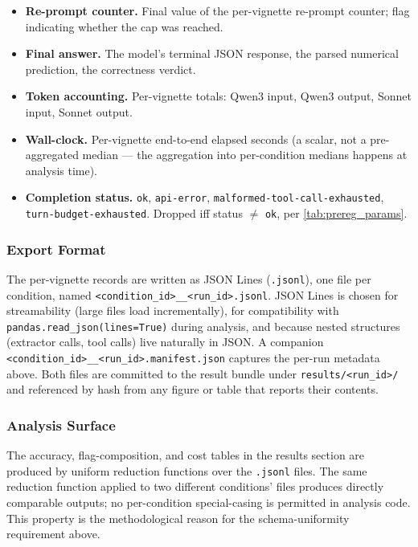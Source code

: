 \begin{itemize}
\begin{itemize}
                time, MCP dispatch time. Enables decomposing
                end-to-end latency into extractor vs. tool-call vs.
                model-generation components.
        \end{itemize}
  \item \textbf{Re-prompt counter.} Final value of the per-vignette
        re-prompt counter; flag indicating whether the cap was
        reached.
  \item \textbf{Final answer.} The model's terminal JSON response,
        the parsed numerical prediction, the correctness verdict.
  \item \textbf{Token accounting.} Per-vignette totals: Qwen3 input,
        Qwen3 output, Sonnet input, Sonnet output.
  \item \textbf{Wall-clock.} Per-vignette end-to-end elapsed seconds
        (a scalar, not a pre-aggregated median --- the aggregation
        into per-condition medians happens at analysis time).
  \item \textbf{Completion status.} \texttt{ok}, \texttt{api-error},
        \texttt{malformed-tool-call-exhausted},
        \texttt{turn-budget-exhausted}. Dropped iff status $\ne$
        \texttt{ok}, per \cref{tab:prereg_params}.
\end{itemize}

\subsubsection{Export Format}

The per-vignette records are written as JSON Lines (\verb|.jsonl|),
one file per condition, named
\verb|<condition_id>__<run_id>.jsonl|. JSON Lines is chosen for
streamability (large files load incrementally), for compatibility
with \texttt{pandas.read\_json(lines=True)} during analysis, and
because nested structures (extractor calls, tool calls) live
naturally in JSON. A companion \verb|<condition_id>__<run_id>.manifest.json|
captures the per-run metadata above. Both files are committed to the
result bundle under \verb|results/<run_id>/| and referenced by hash
from any figure or table that reports their contents.

\subsubsection{Analysis Surface}

The accuracy, flag-composition, and cost tables in the results
section are produced by uniform reduction functions over the
\verb|.jsonl| files. The same reduction function applied to two
different conditions' files produces directly comparable outputs;
no per-condition special-casing is permitted in analysis code. This
property is the methodological reason for the schema-uniformity
requirement above.
